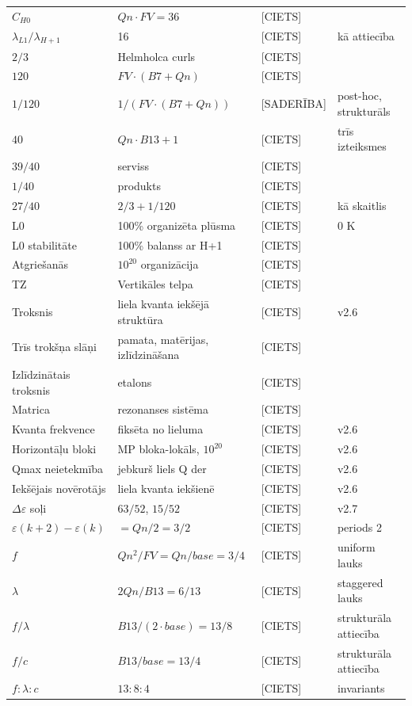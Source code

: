 \documentclass[12pt,a4paper]{article}
\begin{document}
\begin{longtable}{|l|l|l|l|}
$C_{H0}$ & $Qn\cdot FV=36$ & [CIETS] & \\
$\lambda_{L1}/\lambda_{H+1}$ & 16 & [CIETS] & kā attiecība \\
$2/3$ & Helmholca curls & [CIETS] & \\
$120$ & $FV\cdot(B7+Qn)$ & [CIETS] & \\
$1/120$ & $1/(FV\cdot(B7+Qn))$ & [SADERĪBA] & post-hoc, strukturāls \\
$40$ & $Qn\cdot B13+1$ & [CIETS] & trīs izteiksmes \\
$39/40$ & serviss & [CIETS] & \\
$1/40$ & produkts & [CIETS] & \\
$27/40$ & $2/3+1/120$ & [CIETS] & kā skaitlis \\
\hline
L0 & 100\% organizēta plūsma & [CIETS] & 0 K \\
L0 stabilitāte & 100\% balanss ar H+1 & [CIETS] & \\
Atgriešanās & $10^{20}$ organizācija & [CIETS] & \\
TZ & Vertikāles telpa & [CIETS] & \\
\hline
Troksnis & liela kvanta iekšējā struktūra & [CIETS] & v2.6 \\
Trīs trokšņa slāņi & pamata, matērijas, izlīdzināšana & [CIETS] & \\
Izlīdzinātais troksnis & etalons & [CIETS] & \\
Matrica & rezonanses sistēma & [CIETS] & \\
\hline
Kvanta frekvence & fiksēta no lieluma & [CIETS] & v2.6 \\
Horizontāļu bloki & MP bloka-lokāls, $10^{20}$ & [CIETS] & v2.6 \\
Qmax neietekmība & jebkurš liels Q der & [CIETS] & v2.6 \\
Iekšējais novērotājs & liela kvanta iekšienē & [CIETS] & v2.6 \\
\hline
$\Delta\varepsilon$ soļi & $63/52$, $15/52$ & [CIETS] & v2.7 \\
$\varepsilon(k+2)-\varepsilon(k)$ & $= Qn/2 = 3/2$ & [CIETS] & periods 2 \\
$f$ & $Qn^2/FV = Qn/base = 3/4$ & [CIETS] & uniform lauks \\
$\lambda$ & $2Qn/B13 = 6/13$ & [CIETS] & staggered lauks \\
$f/\lambda$ & $B13/(2\cdot base) = 13/8$ & [CIETS] & strukturāla attiecība \\
$f/c$ & $B13/base = 13/4$ & [CIETS] & strukturāla attiecība \\
$f:\lambda:c$ & $13:8:4$ & [CIETS] & invariants \\

\end{longtable}
\end{document}
